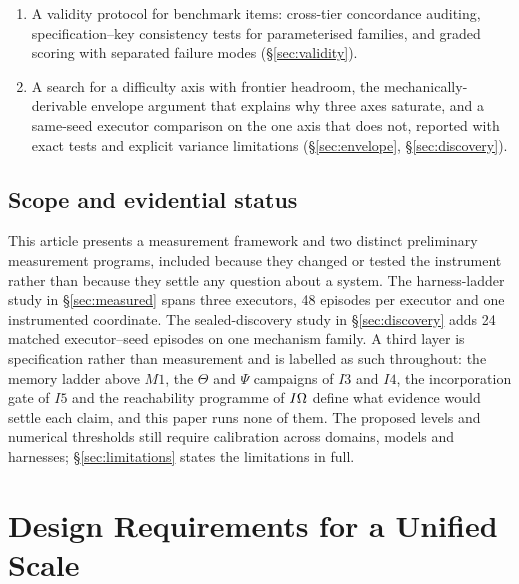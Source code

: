 \begin{enumerate}
\item A validity protocol for benchmark items: cross-tier concordance auditing, specification--key consistency tests for parameterised families, and graded scoring with separated failure modes (\S\ref{sec:validity}).
\item A search for a difficulty axis with frontier headroom, the mechanically-derivable envelope argument that explains why three axes saturate, and a same-seed executor comparison on the one axis that does not, reported with exact tests and explicit variance limitations (\S\ref{sec:envelope}, \S\ref{sec:discovery}).
\end{enumerate}
\endgroup

\subsection{Scope and evidential status}

This article presents a measurement framework and two distinct preliminary measurement programs, included because they changed or tested the instrument rather than because they settle any question about a system. The harness-ladder study in \S\ref{sec:measured} spans three executors, 48 episodes per executor and one instrumented coordinate. The sealed-discovery study in \S\ref{sec:discovery} adds 24 matched executor--seed episodes on one mechanism family. A third layer is specification rather than measurement and is labelled as such throughout: the memory ladder above $M1$, the $\Theta$ and $\Psi$ campaigns of $I3$ and $I4$, the incorporation gate of $I5$ and the reachability programme of $I\Omega{}$ define what evidence would settle each claim, and this paper runs none of them. The proposed levels and numerical thresholds still require calibration across domains, models and harnesses; \S\ref{sec:limitations} states the limitations in full.

\section{Design Requirements for a Unified Scale}

